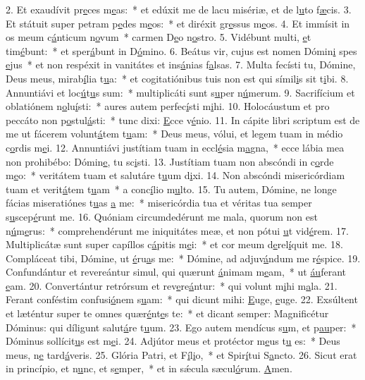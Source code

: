 2. Et exaudívit pr\uline{e}ces m\uline{e}as:~* et edúxit me de lacu misériæ, et de l\uline{u}to f\uline{æ}cis.
3. Et státuit super petram p\uline{e}des m\uline{e}os:~* et diréxit gr\uline{e}ssus m\uline{e}os.
4. Et immísit in os meum c\uline{á}nticum n\uline{o}vum~* carmen D\uline{e}o n\uline{o}stro.
5. Vidébunt multi, \uline{e}t tim\uline{é}bunt:~* et sper\uline{á}bunt in D\uline{ó}mino.
6. Beátus vir, cujus est nomen Dómin\uline{i} spes \uline{e}jus~* et non respéxit in vanitátes et ins\uline{á}nias f\uline{a}lsas.
7. Multa fecísti tu, Dómine, Deus meus, mirab\uline{í}lia t\uline{u}a:~* et cogitatiónibus tuis non est qui símil\uline{i}s sit t\uline{i}bi.
8. Annuntiávi et loc\uline{ú}t\uline{u}s sum:~* multiplicáti sunt s\uline{u}per n\uline{ú}merum.
9. Sacrifícium et oblatiónem n\uline{o}lu\uline{í}sti:~* aures autem perfec\uline{í}sti m\uline{i}hi.
10. Holocáustum et pro peccáto non p\uline{o}stul\uline{á}sti:~* tunc dixi: \uline{E}cce v\uline{é}nio.
11. In cápite libri scriptum est de me ut fácerem volunt\uline{á}tem t\uline{u}am:~* Deus meus, vólui, et legem tuam in médio c\uline{o}rdis m\uline{e}i.
12. Annuntiávi justítiam tuam in eccl\uline{é}sia m\uline{a}gna,~* ecce lábia mea non prohibébo: Dómin\uline{e}, tu sc\uline{i}sti.
13. Justítiam tuam non abscóndi in c\uline{o}rde m\uline{e}o:~* veritátem tuam et salutáre t\uline{u}um d\uline{i}xi.
14. Non abscóndi misericórdiam tuam et verit\uline{á}tem t\uline{u}am~* a conc\uline{í}lio m\uline{u}lto.
15. Tu autem, Dómine, ne longe fácias miseratiónes t\uline{u}as \uline{a} me:~* misericórdia tua et véritas tua semper s\uline{u}scep\uline{é}runt me.
16. Quóniam circumdedérunt me mala, quorum non est n\uline{ú}m\uline{e}rus:~* comprehendérunt me iniquitátes meæ, et non pótui \uline{u}t vid\uline{é}rem.
17. Multiplicátæ sunt super capíllos c\uline{á}pitis m\uline{e}i:~* et cor meum d\uline{e}rel\uline{í}quit me.
18. Compláceat tibi, Dómine, ut \uline{é}ru\uline{a}s me:~* Dómine, ad adjuv\uline{á}ndum me r\uline{é}spice.
19. Confundántur et revereántur simul, qui quærunt \uline{á}nimam m\uline{e}am,~* ut \uline{áu}ferant \uline{e}am.
20. Convertántur retrórsum et rev\uline{e}re\uline{á}ntur:~* qui volunt m\uline{i}hi m\uline{a}la.
21. Ferant conféstim confusi\uline{ó}nem s\uline{u}am:~* qui dicunt mihi: \uline{E}uge, \uline{e}uge.
22. Exsúltent et læténtur super te omnes quær\uline{é}nt\uline{e}s te:~* et dicant semper: Magnificétur Dóminus: qui díligunt salut\uline{á}re t\uline{u}um.
23. Ego autem mendícus s\uline{u}m, et p\uline{au}per:~* Dóminus sollícit\uline{u}s est m\uline{e}i.
24. Adjútor meus et protéctor m\uline{e}us t\uline{u} es:~* Deus meus, n\uline{e} tard\uline{á}veris.
25. Glória Patri, et F\uline{í}l\uline{i}o,~* et Spir\uline{í}tui S\uline{a}ncto.
26. Sicut erat in princípio, et n\uline{u}nc, et s\uline{e}mper,~* et in sǽcula sæcul\uline{ó}rum. \uline{A}men.
